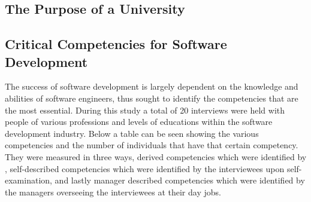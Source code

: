 \subsection{The Purpose of a University}
\subsection{Critical Competencies for Software Development}
\par{The success of software development is largely dependent on the knowledge and abilities of software engineers, thus \cite{turley1994identifying} sought to identify the competencies that are the most essential. During this study a total of 20 interviews were held with people of various professions and levels of educations within the software development industry. Below a table can be seen showing the various competencies and the number of individuals that have that certain competency. They were measured in three ways, derived competencies which were identified by \cite{turley1994identifying}, self-described competencies which were identified by the interviewees upon self-examination, and lastly manager described competencies which were identified by the managers overseeing the interviewees at their day jobs.}
\pagebreak
